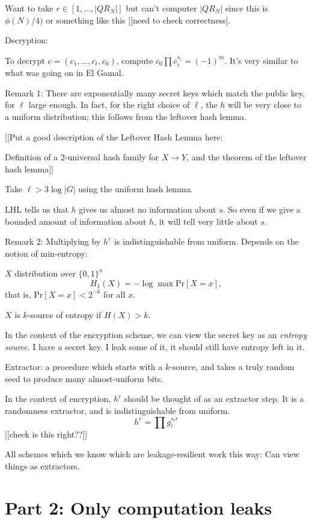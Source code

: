 \documentclass[10pt]{article}
\newcommand{\bit}{\{0,1\}}
\newcommand{\Prob}[1]{\text{Pr}\left[ {#1} \right]}
\begin{document}
Want to take $r \in [1, \ldots, |QR_N|]$ but can't computer $|QR_N|$ since this is $\phi(N)/4)$ or something like this [[need to check correctness].

Decryption:

To decrypt $c = (c_1, \ldots, c_\ell, c_0)$, compute $c_0 \prod c_i^{s_i} = (-1)^m$. It's very similar to what was going on in El Gamal.

Remark 1: There are exponentially many secret keys which match the public key, for $\ell$ large enough. In fact, for the right choice of $\ell$, the $h$ will be very close to a uniform distribution; this follows from the leftover hash lemma. 

[[Put a good description of the Leftover Hash Lemma here:

Definition of a 2-universal hash family for $X \to Y$, and the theorem of the leftover hash lemma]]

Take $\ell > 3 \log |G|$ using the uniform hash lemma.

LHL tells us that $h$ gives us almost no information about $s$. So even if we give a bounded amount of information about $h$, it will tell very little about $s$.

Remark 2: Multiplying by $h^r$ is indistinguishable from uniform.  Depends on the notion of min-entropy:

$X$ distribution over $\bit^n$
\[
H_1(X) = -\log \max \Prob{X = x},
\]
that is, $\Prob{X = x} < 2^{-k}$ for all $x$.

$X$ is $k$-source of entropy if $H(X) > k$.

In the context of the encryption scheme, we can view the secret key as an \emph{entropy source}. I have a secret key. I leak some of it, it should still have entropy left in it.

Extractor: a procedure which starts with a $k$-source, and takes a truly random seed to produce many almost-uniform bits.

In the context of encryption, $h^r$ should be thought of as an extractor step. It is a randomness extractor, and is indistinguishable from uniform.
\[
h^r = \prod g_i^{s_i r}
\]
[[check is this right??]]

All schemes which we know which are leakage-resilient work this way: Can view things as extractors.

\section{Part 2: Only computation leaks}
\end{document}
